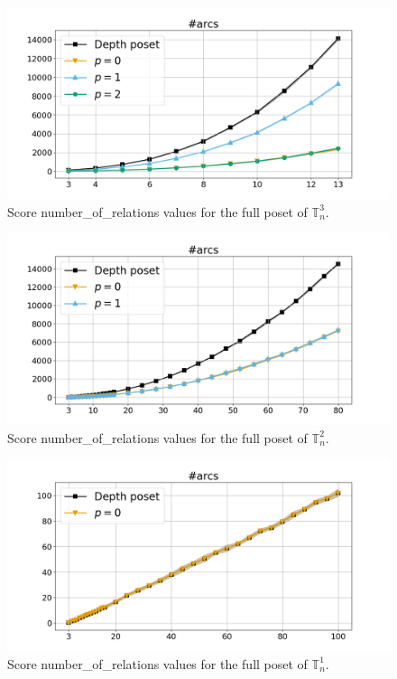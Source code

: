 \documentclass{article}
\begin{document}
    \begin{figure}[h!]
        \centering
        \hspace*{-0.24\textwidth}
        \includegraphics[width=1.4\textwidth]{pics/extended torus scores/score=number-of-relations, dim=3, object=full.png}
        \caption{Score number\_of\_relations values for the full poset of $\mathbb{T}_n^{3}$.}
        \label{fig:numberofrelations-full3}
    \end{figure}
    \begin{figure}[h!]
        \centering
        \hspace*{-0.24\textwidth}
        \includegraphics[width=1.4\textwidth]{pics/extended torus scores/score=number-of-relations, dim=2, object=full.png}
        \caption{Score number\_of\_relations values for the full poset of $\mathbb{T}_n^{2}$.}
        \label{fig:numberofrelations-full2}
    \end{figure}
    \begin{figure}[h!]
        \centering
        \hspace*{-0.24\textwidth}
        \includegraphics[width=1.4\textwidth]{pics/extended torus scores/score=number-of-relations, dim=1, object=full.png}
        \caption{Score number\_of\_relations values for the full poset of $\mathbb{T}_n^{1}$.}
        \label{fig:numberofrelations-full1}
    \end{figure}
\end{document}
